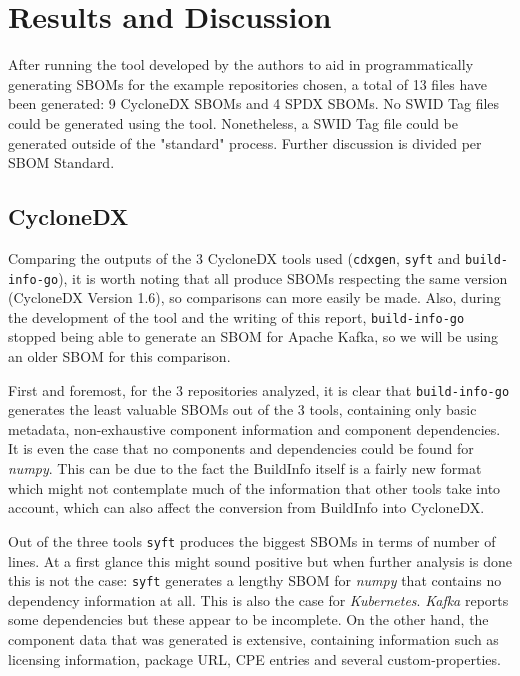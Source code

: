 \section{Results and Discussion} \label{results}

After running the tool developed by the authors to aid in programmatically generating SBOMs for the example repositories chosen, a total of 13 files have been generated: 9 CycloneDX SBOMs and 4 SPDX SBOMs. No SWID Tag files could be generated using the tool. Nonetheless, a SWID Tag file could be generated outside of the "standard" process. Further discussion is divided per SBOM Standard.

\subsection{CycloneDX} \label{results:cdx}

Comparing the outputs of the 3 CycloneDX tools used (\verb|cdxgen|, \verb|syft| and \verb|build-info-go|), it is worth noting that all produce SBOMs respecting the same version (CycloneDX Version 1.6), so comparisons can more easily be made. Also, during the development of the tool and the writing of this report, \verb|build-info-go| stopped being able to generate an SBOM for Apache Kafka, so we will be using an older SBOM for this comparison.

First and foremost, for the 3 repositories analyzed, it is clear that \verb|build-info-go| generates the least valuable SBOMs out of the 3 tools, containing only basic metadata, non-exhaustive component information and component dependencies. It is even the case that no components and dependencies could be found for \textit{numpy}. This can be due to the fact the BuildInfo itself is a fairly new format which might not contemplate much of the information that other tools take into account, which can also affect the conversion from BuildInfo into CycloneDX.

Out of the three tools \verb|syft| produces the biggest SBOMs in terms of number of lines. At a first glance this might sound positive but when further analysis is done this is not the case: \verb|syft| generates a lengthy SBOM for \textit{numpy} that contains no dependency information at all. This is also the case for \textit{Kubernetes}. \textit{Kafka} reports some dependencies but these appear to be incomplete. On the other hand, the component data that was generated is extensive, containing information such as licensing information, package URL, CPE entries and several custom-properties.

